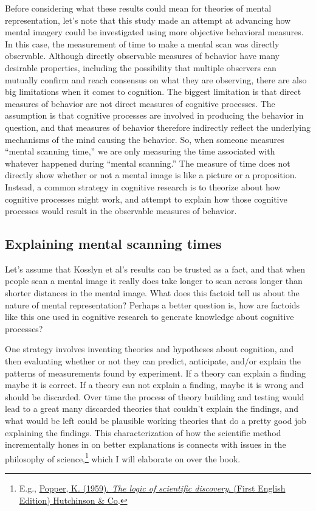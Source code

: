 \documentclass[
  oneside,
  12pt]{crumpbook}
\begin{document}
Before considering what these results could mean for theories of mental representation, let's note that this study made an attempt at advancing how mental imagery could be investigated using more objective behavioral measures. In this case, the measurement of time to make a mental scan was directly observable. Although directly observable measures of behavior have many desirable properties, including the possibility that multiple observers can mutually confirm and reach consensus on what they are observing, there are also big limitations when it comes to cognition. The biggest limitation is that direct measures of behavior are not direct measures of cognitive processes. The assumption is that cognitive processes are involved in producing the behavior in question, and that measures of behavior therefore indirectly reflect the underlying mechanisms of the mind causing the behavior. So, when someone measures ``mental scanning time,'' we are only measuring the time associated with whatever happened during ``mental scanning.'' The measure of time does not directly show whether or not a mental image is like a picture or a proposition. Instead, a common strategy in cognitive research is to theorize about how cognitive processes might work, and attempt to explain how those cognitive processes would result in the observable measures of behavior.

\hypertarget{explaining-mental-scanning-times}{%
\subsection{Explaining mental scanning times}\label{explaining-mental-scanning-times}}

Let's assume that Kosslyn et al's results can be trusted as a fact, and that when people scan a mental image it really does take longer to scan across longer than shorter distances in the mental image. What does this factoid tell us about the nature of mental representation? Perhaps a better question is, how are factoids like this one used in cognitive research to generate knowledge about cognitive processes?

One strategy involves inventing theories and hypotheses about cognition, and then evaluating whether or not they can predict, anticipate, and/or explain the patterns of measurements found by experiment. If a theory can explain a finding maybe it is correct. If a theory can not explain a finding, maybe it is wrong and should be discarded. Over time the process of theory building and testing would lead to a great many discarded theories that couldn't explain the findings, and what would be left could be plausible working theories that do a pretty good job explaining the findings. This characterization of how the scientific method incrementally hones in on better explanations is connects with issues in the philosophy of science,\footnote{E.g., \protect\hyperlink{ref-popperLogicScientificDiscovery1959}{Popper, K. (1959). \emph{The logic of scientific discovery}. {(First English Edition) Hutchinson \& Co}}.} which I will elaborate on over the book.
\end{document}
